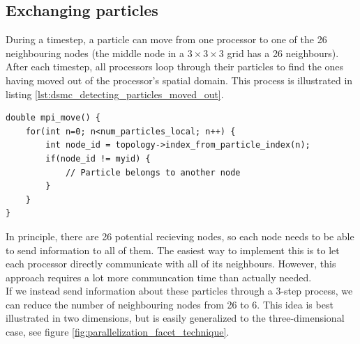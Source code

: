 \subsection{Exchanging particles}
During a timestep, a particle can move from one processor to one of the 26 neighbouring nodes (the middle node in a $3\times3\times3$ grid has a 26 neighbours). After each timestep, all processors loop through their particles to find the ones having moved out of the processor's spatial domain. This process is illustrated in listing \ref{lst:dsmc_detecting_particles_moved_out}.
\begin{lstlisting}[caption=Detecting which particles having moved out of a processor's spatial domain., label=lst:dsmc_detecting_particles_moved_out]
double mpi_move() {
	for(int n=0; n<num_particles_local; n++) {
		int node_id = topology->index_from_particle_index(n);
		if(node_id != myid) {
			// Particle belongs to another node
		}
	}
}
\end{lstlisting}
In principle, there are 26 potential recieving nodes, so each node needs to be able to send information to all of them. The easiest way to implement this is to let each processor directly communicate with all of its neighbours. However, this approach requires a lot more communcation time than actually needed.\\
If we instead send information about these particles through a 3-step process, we can reduce the number of neighbouring nodes from 26 to 6. This idea is best illustrated in two dimensions, but is easily generalized to the three-dimensional case, see figure \ref{fig:parallelization_facet_technique}.
